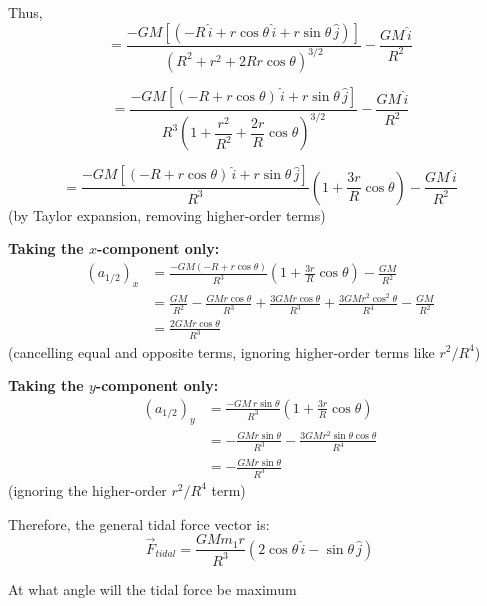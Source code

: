 \documentclass[10pt, a4paper]{article}
\begin{document}
Thus,
\[
= \frac{-GM\left[(-R\,\hat{i} + r\cos\theta\,\hat{i} + r\sin\theta\,\hat{j})\right]}{(R^2 + r^2 + 2Rr\cos\theta)^{3/2}} - \frac{GM\,\hat{i}}{R^2}
\]

\[
= \frac{-GM\left[(-R + r\cos\theta)\,\hat{i} + r\sin\theta\,\hat{j}\right]}{R^3\!\left(1 + \dfrac{r^2}{R^2} + \dfrac{2r}{R}\cos\theta\right)^{3/2}} - \frac{GM\,\hat{i}}{R^2}
\]

\[
= \frac{-GM\left[(-R + r\cos\theta)\,\hat{i} + r\sin\theta\,\hat{j}\right]}{R^3}\left(1 + \frac{3r}{R}\cos\theta\right) - \frac{GM\,\hat{i}}{R^2}
\]
(by Taylor expansion, removing higher-order terms)

\bigskip
\noindent\textbf{Taking the $x$-component only:}
\begin{align*}
(a_{1/2})_x 
&= \frac{-GM(-R + r\cos\theta)}{R^3}\!\left(1 + \frac{3r}{R}\cos\theta\right) - \frac{GM}{R^2} \\[6pt]
&= \frac{GM}{R^2} - \frac{GMr\cos\theta}{R^3} + \frac{3GMr\cos\theta}{R^3} + \frac{3GMr^2\cos^2\theta}{R^4} - \frac{GM}{R^2} \\[6pt]
&= \frac{2GMr\cos\theta}{R^3}
\end{align*}
(cancelling equal and opposite terms, ignoring higher-order terms like $r^2/R^4$)

\bigskip
\noindent\textbf{Taking the $y$-component only:}
\begin{align*}
(a_{1/2})_y 
&= \frac{-GM\,r\sin\theta}{R^3}\!\left(1 + \frac{3r}{R}\cos\theta\right) \\[6pt]
&= -\frac{GMr\sin\theta}{R^3} - \frac{3GMr^2\sin\theta\cos\theta}{R^4} \\[6pt]
&= -\frac{GMr\sin\theta}{R^3}
\end{align*}
(ignoring the higher-order $r^2/R^4$ term)

\bigskip
\noindent Therefore, the general tidal force vector is:
\[
\boxed{\vec{F}_{tidal} = \frac{GMm_{1}r}{R^3}\left(2\cos\theta\,\hat{i} - \sin\theta\,\hat{j}\right)}
\]

\begin{tcolorbox}[colback=blue!5!white,colframe=blue!75!black,title=Problem]
At what angle will the tidal force be maximum
\end{tcolorbox}
\end{document}

